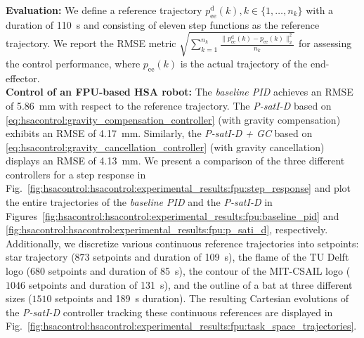 \noindent\textbf{Evaluation:}
We define a reference trajectory $p_\mathrm{ee}^\mathrm{d}(k), k \in \{ 1, \dots, n_k \}$ with a duration of \SI{110}{s} and consisting of eleven step functions as the reference trajectory.
We report the \gls{RMSE} metric $\sqrt{\sum_{k=1}^{n_k} \frac{\lVert p_\mathrm{ee}^\mathrm{d}(k) - p_\mathrm{ee}(k) \rVert_2^2}{n_k}}$ for assessing the control performance, where $p_\mathrm{ee}(k)$ is the actual trajectory of the end-effector.\\

\noindent\textbf{Control of an FPU-based HSA robot:}
The \emph{baseline PID} achieves an \gls{RMSE} of \SI{5.86}{mm} with respect to the reference trajectory. The \emph{P-satI-D} based on \eqref{eq:hsacontrol:gravity_compensation_controller} (with gravity compensation) exhibits an RMSE of \SI{4.17}{mm}. Similarly, the \emph{P-satI-D + GC} based on \eqref{eq:hsacontrol:gravity_cancellation_controller} (with gravity cancellation) displays an RMSE of \SI{4.13}{mm}.
We present a comparison of the three different controllers for a step response in Fig.~\ref{fig:hsacontrol:hsacontrol:experimental_results:fpu:step_response} and plot the entire trajectories of the \emph{baseline PID} and the \emph{P-satI-D} in Figures~\ref{fig:hsacontrol:hsacontrol:experimental_results:fpu:baseline_pid} and \ref{fig:hsacontrol:hsacontrol:experimental_results:fpu:p_sati_d}, respectively.
Additionally, we discretize various continuous reference trajectories into setpoints: 
star trajectory ($873$ setpoints and duration of \SI{109}{s}), the flame of the TU Delft logo ($680$ setpoints and duration of \SI{85}{s}), the contour of the MIT-CSAIL logo ($1046$ setpoints and duration of \SI{131}{s}), and the outline of a bat at three different sizes ($1510$ setpoints and \SI{189}{s} duration).
The resulting Cartesian evolutions of the \emph{P-satI-D} controller tracking these continuous references are displayed in Fig.~\ref{fig:hsacontrol:hsacontrol:experimental_results:fpu:task_space_trajectories}.

